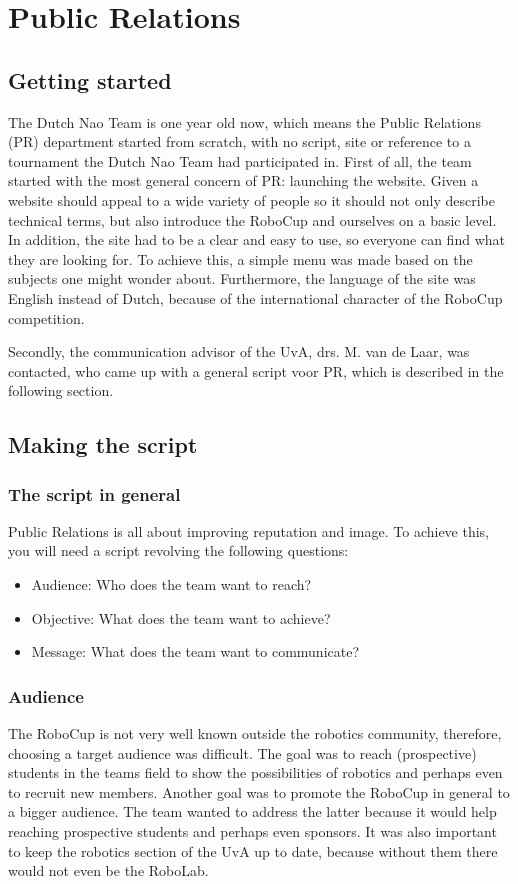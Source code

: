 \documentclass[a4paper]{article}
\begin{document}
\section{Public Relations}
\subsection{Getting started}
The Dutch Nao Team is one year old now, which means the Public Relations (PR) department started from scratch, with no script, site or reference to a tournament the Dutch Nao Team had participated in. First of all, the team started with the most general concern of PR: launching the website. Given a website should appeal to a wide variety of people so it should not only describe technical terms, but also introduce the RoboCup and ourselves on a basic level. In addition, the site had to be a clear and easy to use, so everyone can find what they are looking for. To achieve this, a simple menu was made based on the subjects one might wonder about. Furthermore, the language of the site was English instead of Dutch, because of the international character of the RoboCup competition.

Secondly, the communication advisor of the UvA, drs. M. van de Laar, was contacted, who came up with a general script voor PR, which is described in the following section.

\subsection{Making the script}
\subsubsection{The script in general}
Public Relations is all about improving reputation and image. To achieve this, you will need a script revolving the following questions:
\begin{itemize}
\item Audience: Who does the team want to reach?
\item Objective: What does the team want to achieve?
\item Message: What does the team want to communicate?
\end{itemize}

\subsubsection{Audience}
The RoboCup is not very well known outside the robotics community, therefore, choosing a target audience was difficult. The goal was to reach (prospective) students in the teams field to show the possibilities of robotics and perhaps even to recruit new members. Another goal was to promote the RoboCup in general to a bigger audience. The team wanted to address the latter because it would help reaching prospective students and perhaps even sponsors. It was also important to keep the robotics section of the UvA up to date, because without them there would not even be the RoboLab.
\end{document}
